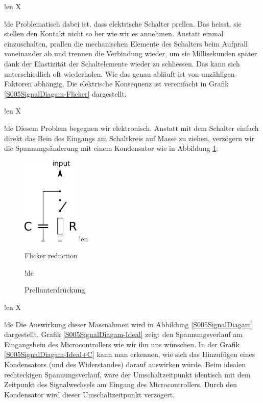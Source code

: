 !en X

!de Problematisch dabei ist, dass elektrische Schalter prellen. Das heisst, sie stellen den Kontakt nicht so her wie wir es annehmen. Anstatt einmal einzuschalten, prallen die mechanischen Elemente des Schalters beim Aufprall voneinander ab und trennen die Verbindung wieder, um sie Millisekunden später dank der Elastizität der Schaltelemente wieder zu schliessen. Das kann sich unterschiedlich oft wiederholen. Wie das genau abläuft ist von unzähligen Faktoren abhängig. Die elektrische Konsequenz ist vereinfacht in Grafik \ref{S005SignalDiagam-Flicker} dargestellt.



!en X

!de Diesem Problem begegnen wir elektronisch. Anstatt mit dem Schalter einfach direkt das Bein des Eingangs am Schaltkreis auf Masse zu ziehen, verzögern wir die Spannungsänderung mit einem Kondensator wie in Abbildung \ref{S005FlickerReduction}.


\begin{figure}[htbp]
  \centering
    \includegraphics[width=0.24\textwidth]{LED/S005_stable-decisions_no-flicker.pdf}
!en   \caption{Flicker reduction}
!de   \caption{Prellunterdrückung}
  \label{S005FlickerReduction}
\end{figure}




!en X

!de Die Auswirkung dieser Massnahmen wird in Abbildung \ref{S005SignalDiagam} dargestellt. Grafik \ref{S005SignalDiagam-Ideal} zeigt den Spannungsverlauf am Eingangsbein des Microcontrollers wie wir ihn uns wünschen. In der Grafik \ref{S005SignalDiagam-Ideal+C} kann man erkennen, wie sich das Hinzufügen eines Kondensators (und des Widerstandes) darauf auswirken würde. Beim idealen rechteckigen Spannungsverlauf, wäre der Umschaltzeitpunkt identisch mit dem Zeitpunkt des Signalwechsels am Eingang des Microcontrollers. Durch den Kondensator wird dieser Umschaltzeitpunkt verzögert.




